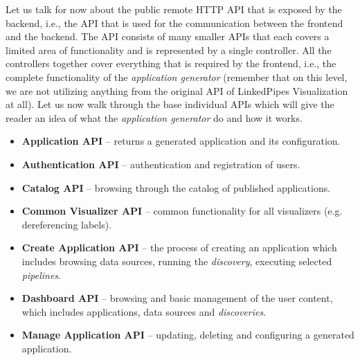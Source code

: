 Let us talk for now about the public remote HTTP API that is exposed by the backend, i.e., the API that is used for the communication between the frontend and the backend. The API consists of many smaller APIs that each covers a limited area of functionality and is represented by a single controller. All the controllers together cover everything that is required by the frontend, i.e., the complete functionality of the \emph{application generator} (remember that on this level, we are not utilizing anything from the original API of LinkedPipes Visualization at all). Let us now walk through the base individual APIs which will give the reader an idea of what the \emph{application generator} do and how it works.

\begin{itemize}
\item \textbf{Application API} -- returns a generated application and its configuration.
\item \textbf{Authentication API} -- authentication and registration of users.
\item \textbf{Catalog API} -- browsing through the catalog of published applications.
\item \textbf{Common Visualizer API} -- common functionality for all visualizers (e.g. dereferencing labels).
\item \textbf{Create Application API} -- the process of creating an application which includes browsing data sources, running the \emph{discovery}, executing selected \emph{pipelines}.
\item \textbf{Dashboard API} -- browsing and basic management of the user content, which includes applications, data sources and \emph{discoveries}.
\item \textbf{Manage Application API} -- updating, deleting and configuring a generated application.
\end{itemize}

